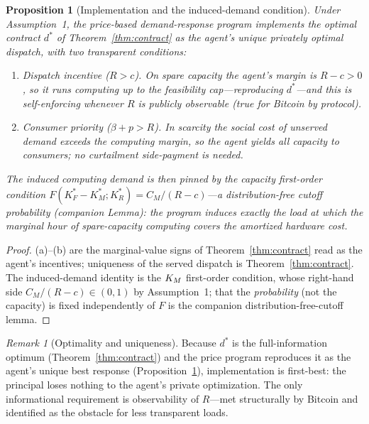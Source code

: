 \documentclass[11pt,reqno]{amsart}
\theoremstyle{plain}
\newtheorem{proposition}{Proposition}
\theoremstyle{definition}
\theoremstyle{remark}
\newtheorem{remark}{Remark}
\newcommand{\KRs}{K_R^{*}}\newcommand{\KFs}{K_F^{*}}\newcommand{\KMs}{K_M^{*}}
\newcommand{\CM}{C_M}\newcommand{\CF}{C_F}\newcommand{\CR}{C_R}
\newcommand{\bp}{\beta+p}
\newcommand{\dstar}{d^{*}}
\begin{document}
\begin{proposition}[Implementation and the induced-demand condition]\label{prop:pa}
Under Assumption~1, the price-based demand-response program implements the optimal
contract $\dstar$ of Theorem~\ref{thm:contract} as the agent's \emph{unique}
privately optimal dispatch, with two transparent conditions:
\begin{enumerate}[label=(\alph*),leftmargin=2.2em]
  \item \emph{Dispatch incentive ($R>c$).} On spare capacity the agent's margin is
        $R-c>0$, so it runs computing up to the feasibility cap---reproducing
        $\dstar$---and this is self-enforcing whenever $R$ is publicly observable
        (true for Bitcoin by protocol).
  \item \emph{Consumer priority ($\bp>R$).} In scarcity the social cost of unserved
        demand exceeds the computing margin, so the agent yields all capacity to
        consumers; no curtailment side-payment is needed.
\end{enumerate}
The induced computing demand is then pinned by the capacity first-order condition
$F(\KFs-\KMs;\KRs)=\CM/(R-c)$---a \emph{distribution-free} cutoff probability
(companion Lemma): the program induces exactly the load at which the marginal
hour of spare-capacity computing covers the amortized hardware cost.
\end{proposition}

\begin{proof}
(a)--(b) are the marginal-value signs of Theorem~\ref{thm:contract} read as the
agent's incentives; uniqueness of the served dispatch is
Theorem~\ref{thm:contract}. The induced-demand identity is the $K_M$ first-order
condition, whose right-hand side $\CM/(R-c)\in(0,1)$ by Assumption~1; that the
\emph{probability} (not the capacity) is fixed independently of $F$ is the
companion distribution-free-cutoff lemma.
\end{proof}

\begin{remark}[Optimality and uniqueness]
Because $\dstar$ is the full-information optimum (Theorem~\ref{thm:contract}) and
the price program reproduces it as the agent's unique best response
(Proposition~\ref{prop:pa}), implementation is first-best: the principal loses
nothing to the agent's private optimization. The only informational requirement is
observability of $R$---met structurally by Bitcoin and identified as the obstacle
for less transparent loads.
\end{remark}
\end{document}
